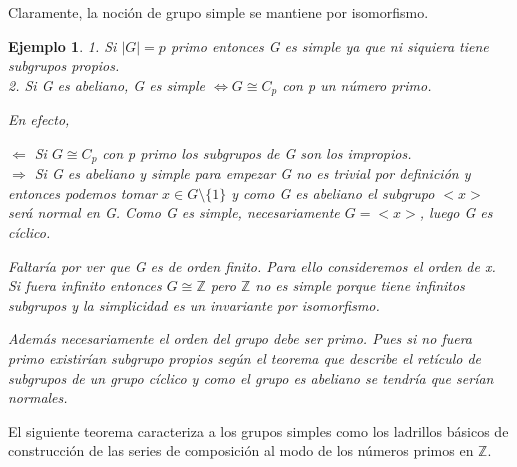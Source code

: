 \documentclass{article}
\theoremstyle{theorem-style}  %
\theoremstyle{definition-style}
\theoremstyle{example-style}
\newtheorem{example}{Ejemplo}[section]
\begin{document}
Claramente, la noción de grupo simple se mantiene por isomorfismo.

\begin{example}
1. Si $|G| = p$ primo entonces G es simple ya que ni siquiera tiene subgrupos propios. \\
2. Si G es abeliano, G es simple $\iff G \cong C_p$ con p un número primo.

En efecto, 

$\Leftarrow$ Si $G \cong C_p$ con p primo los subgrupos de G son los impropios. \\
$\Rightarrow$ Si G es abeliano y simple para empezar G no es trivial por definición y entonces podemos tomar $x \in G \setminus \{1\}$ y como G es abeliano el subgrupo $<x>$ será normal en G. Como G es simple, necesariamente $G = <x>$, luego G es cíclico.

Faltaría por ver que G es de orden finito. Para ello consideremos el orden de x. Si fuera infinito entonces $G \cong \mathbb{Z}$ pero $\mathbb{Z}$ no es simple porque tiene infinitos subgrupos y la simplicidad es un invariante por isomorfismo.

Además necesariamente el orden del grupo debe ser primo. Pues si no fuera primo existirían subgrupo propios según el teorema que describe el retículo de subgrupos de un grupo cíclico y como el grupo es abeliano se tendría que serían normales.
\end{example}

El siguiente teorema caracteriza a los grupos simples como los ladrillos básicos de construcción de las series de composición al modo de los números primos en $\mathbb{Z}$.
\end{document}
